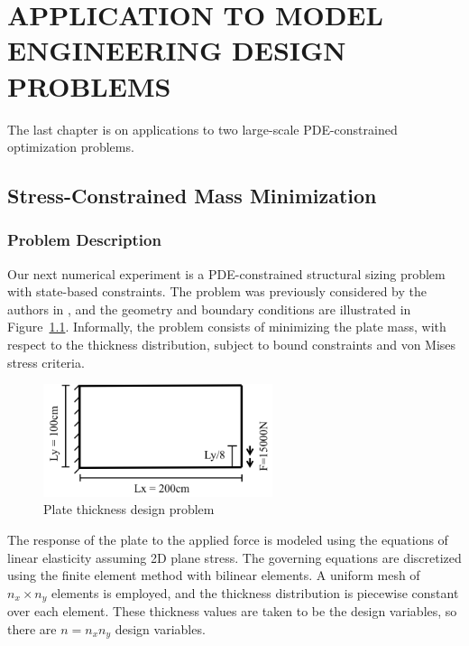  
\chapter{APPLICATION TO MODEL ENGINEERING DESIGN PROBLEMS}
The last chapter is on applications to two large-scale PDE-constrained optimization problems. 


\section{Stress-Constrained Mass Minimization}
\subsection{Problem Description}
Our next numerical experiment is a PDE-constrained structural sizing problem
with state-based constraints.  The problem was previously considered by the
authors in \cite{dener:scitech2016}, and the geometry and boundary conditions
are illustrated in Figure~\ref{fig:struct}.  Informally, the problem consists of
minimizing the plate mass, with respect to the thickness distribution, subject
to bound constraints and von Mises stress criteria. 
\begin{figure}[tbp]
  \centering
  \includegraphics[width=0.6\textwidth]{./figs/chap6_fstopo/struct.png}
  \caption{Plate thickness design problem}
  \label{fig:struct}
\end{figure}

The response of the plate to the applied force is modeled using the equations of
linear elasticity assuming 2D plane stress.  The governing equations are
discretized using the finite element method with bilinear elements.
A uniform mesh of $n_x \times n_y$ elements is employed, and the thickness
distribution is piecewise constant over each element.  These thickness values
are taken to be the design variables, so there are $n = n_x n_y$ design
variables.

